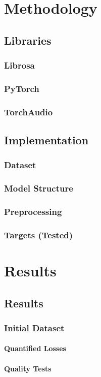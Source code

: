 \documentclass{book}
\begin{document}
\part{Methodology}
\chapter{Libraries}
\section{Librosa}
\section{PyTorch}
\section{TorchAudio}
\chapter{Implementation}
\section{Dataset}
\section{Model Structure}
\section{Preprocessing}
\section{Targets (Tested)}


\part{Results}
\chapter{Results}
\section{Initial Dataset}
\subsection{Quantified Losses}
\subsection{Quality Tests}
\end{document}
